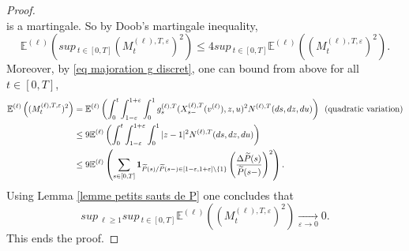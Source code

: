 \documentclass[10pt,a4paper]{amsart}
\def\E{\mathbb{E}}
\renewcommand{\sup}{sup\,}
\def\vp{\varepsilon}
\begin{document}
\begin{proof}
$$$$
is a martingale. So by Doob's martingale inequality,
$$
\E^{(\ell)}
\left(
\sup_{t \in [0,T]}
(M^{(\ell),T,\vp}_t)^2
\right)
\le  4 \sup_{t \in [0,T]} \E^{(\ell)} \left( (M^{(\ell),T,\vp}_t)^2\right).
$$
Moreover, by \eqref{eq majoration g discret}, one can {bound from above} for all $t \in [0,T]$,
\begin{align*}
\E^{(\ell)} \left( (M^{(\ell),T,\vp}_t)^2 \right)
&=\E^{(\ell)} \left(\int_{0}^t \int_{1-\vp}^{1+\vp} \int_0^1
g^{(\ell),T}_s(X^{(\ell),T}_{s-}(v^{(\ell)}),z,u)^2 
{N}^{(\ell),T}(ds,dz,du)
\right) \enskip\text{(quadratic variation)}\\
&\le 9\E^{(\ell)} \left(\int_{0}^t \int_{1-\vp}^{1+\vp} \int_0^1
\vert z-1\vert^2 
{N}^{(\ell),T}(ds,dz,du)
\right) \\
&\le 9 \E^{(\ell)}
\left(
\sum_{s \in[0,T] } {\bf 1}_{ \widetilde{P}(s)/\widetilde{P}(s-) \in [1-\vp,1+\vp]\setminus \{1\} }
\left(\frac{\Delta \widetilde{P}(s)}{\widetilde{P}(s-)}\right)^2 
\right).
\end{align*}
Using Lemma \ref{lemme petits sauts de P} one concludes that
\begin{equation}\label{eq majoration unif de la martingale}
	\sup_{\ell \ge 1} \sup_{t \in [0,T]} \E^{(\ell)} \left( (M^{(\ell),T,\vp}_t)^2\right)
	\mathop{\longrightarrow}\limits_{\vp \to 0} 0.
\end{equation}
This ends the proof.
\end{proof}
\end{document}
